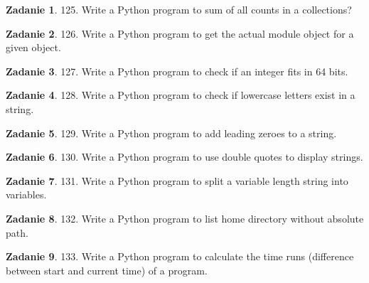 \documentclass[11pt]{article}
\theoremstyle{definition}
\newtheorem{zadanie}{Zadanie}
\begin{document}
\begin{zadanie}


125. Write a Python program to sum of all counts in a collections? 

\end{zadanie}

\begin{zadanie}


126. Write a Python program to get the actual module object for a given object. 

\end{zadanie}

\begin{zadanie}


127. Write a Python program to check if an integer fits in 64 bits. 

\end{zadanie}

\begin{zadanie}


128. Write a Python program to check if lowercase letters exist in a string. 

\end{zadanie}

\begin{zadanie}


129. Write a Python program to add leading zeroes to a string. 

\end{zadanie}

\begin{zadanie}


130. Write a Python program to use double quotes to display strings. 

\end{zadanie}

\begin{zadanie}


131. Write a Python program to split a variable length string into variables. 

\end{zadanie}

\begin{zadanie}


132. Write a Python program to list home directory without absolute path. 

\end{zadanie}

\begin{zadanie}


133. Write a Python program to calculate the time runs (difference between start and current time) of a program. 

\end{zadanie}
\end{document}
